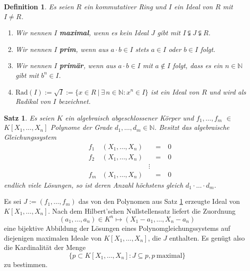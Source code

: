 \documentclass[11pt]{beamer}
\newcommand{\N}{{\mathbb N}}
\newcommand{\coloneqq}{:=}
\theoremstyle{custom}
\newtheorem{proposition}[theorem]{Satz}
\theoremstyle{custom}
\newtheorem{dfn}[theorem]{Definition}
\begin{document}
	\begin{frame}
		\begin{dfn}
			\pause
			Es seien $R$ ein kommutativer Ring und $I$ ein Ideal von $R$ mit $I \neq R$.
			\begin{enumerate}
				\item Wir nennen $I$ \textbf{maximal}, wenn es kein Ideal $J$ gibt mit $I \subsetneqq J \subsetneqq R$.
				\item Wir nennen $I$ \textbf{prim}, wenn aus $a\cdot b \in I$ stets $a \in I$ oder $b \in I$ folgt.
				\item Wir nennen $I$ \textbf{primär}, wenn aus $a\cdot b \in I$ mit $a \not\in I$ folgt, dass es ein $n \in \N$ gibt mit $b^n \in I$.
				\item $\text{Rad}(I) \coloneqq \sqrt{I} \coloneqq \{x \in R \ \left| \  \exists \, n \in \N \colon x^n \in I\right.\}$ ist ein Ideal von $R$ und wird als Radikal von $I$ bezeichnet.
			\end{enumerate}
		\end{dfn}
	\end{frame}
	\begin{frame}
		\begin{proposition}\label{prop:bezout}
			\pause
			Es seien $K$ ein algebraisch abgeschlossener Körper und $f_1,\ldots,f_m$ $\in$ \newline $K[X_1,\ldots,X_n]$ Polynome der Grade $d_1,\ldots,d_m \in \N$. Besitzt das algebraische Gleichungssystem
			\begin{equation*}
				\begin{alignedat}{5}
					&f_{1}&\left(X_{1}, \ldots, X_{n} \right)& \ &=\ &0\\
					&f_{2}&\left(X_{1}, \ldots, X_{n} \right)& \ &=\ &0\\
					&&&  \vdots& &\\
					&f_{m}&\left(X_{1}, \ldots, X_{n} \right)& \ &=\ &0
				\end{alignedat}
			\end{equation*}
			endlich viele Lösungen, so ist deren Anzahl höchstens gleich $d_1 \cdot \ldots \cdot d_m$.
		\end{proposition}
	\end{frame}
	\begin{frame}
		\pause
		Es sei $J \coloneqq (f_1,\ldots,f_m)$ das von den Polynomen aus Satz \ref{prop:bezout} erzeugte Ideal von $K[X_1,\ldots,X_n]$.
		Nach dem Hilbert'schen Nullstellensatz liefert die Zuordnung
		\begin{equation*}
			(a_1,\ldots,a_n) \in K^n \mapsto (X_1 - a_1, \ldots,X_n - a_n)
		\end{equation*}
		eine bijektive Abbildung der Lösungen eines Polynomgleichungssystems auf diejenigen maximalen Ideale von $K[X_1,\ldots,X_n]$, die $J$ enthalten. Es genügt also die Kardinalität der Menge
		\begin{equation*}
			\{p \subset K[X_1,\ldots,X_n] \colon J \subseteq p, p \ \text{maximal}\}
		\end{equation*}
		zu bestimmen.
	\end{frame}
\end{document}
